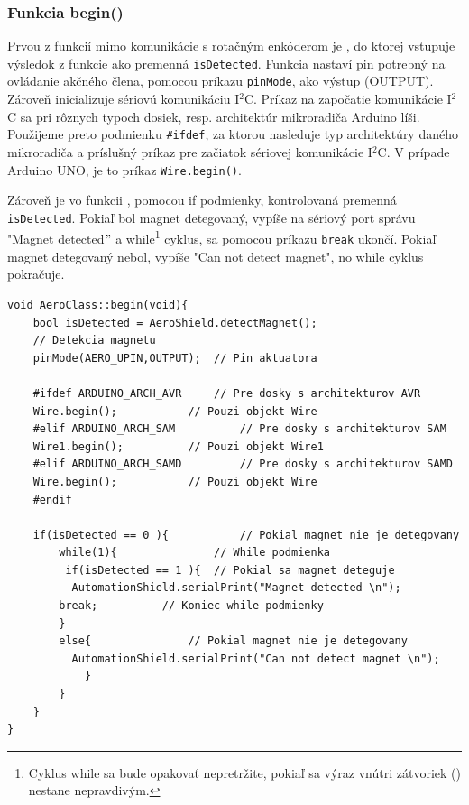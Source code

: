 \subsubsection{Funkcia begin()}

Prvou z funkcií mimo komunikácie s rotačným enkóderom je , do ktorej vstupuje výsledok z funkcie  ako premenná \verb|isDetected|. Funkcia  nastaví pin potrebný na ovládanie akčného člena, pomocou príkazu \verb|pinMode|, ako výstup (OUTPUT). Zároveň inicializuje sériovú komunikáciu I$^{2}$C. Príkaz na započatie komunikácie I$^{2}$C sa pri rôznych typoch dosiek, resp. architektúr mikroradiča Arduino líši. Použijeme preto podmienku \verb|#ifdef|, za ktorou nasleduje typ architektúry daného mikroradiča a príslušný príkaz pre začiatok sériovej komunikácie I$^{2}$C. V prípade Arduino UNO, je to príkaz \verb|Wire.begin()|. 

Zároveň je vo funkcii , pomocou if podmienky, kontrolovaná premenná \verb|isDetected|. Pokiaľ bol magnet detegovaný, vypíše na sériový port správu "Magnet detected$"$ a while\footnote[7]{Cyklus while sa bude opakovať nepretržite, pokiaľ sa výraz vnútri zátvoriek () nestane nepravdivým.} cyklus, sa pomocou príkazu \verb|break| ukončí. Pokiaľ magnet detegovaný nebol, vypíše "Can not detect magnet", no while cyklus pokračuje.  


\begin{lstlisting}[caption={Zdrojový kód funkcie begin.},captionpos=b]
void AeroClass::begin(void){                       
	bool isDetected = AeroShield.detectMagnet(); 
	// Detekcia magnetu 
	pinMode(AERO_UPIN,OUTPUT);	// Pin aktuatora
	
	#ifdef ARDUINO_ARCH_AVR		// Pre dosky s architekturov AVR
	Wire.begin();			// Pouzi objekt Wire
	#elif ARDUINO_ARCH_SAM      	// Pre dosky s architekturov SAM
	Wire1.begin();			// Pouzi objekt Wire1
	#elif ARDUINO_ARCH_SAMD     	// Pre dosky s architekturov SAMD
	Wire.begin();			// Pouzi objekt Wire
	#endif
	
	if(isDetected == 0 ){       	// Pokial magnet nie je detegovany
		while(1){               // While podmienka
		 if(isDetected == 1 ){	// Pokial sa magnet deteguje
		  AutomationShield.serialPrint("Magnet detected \n");	
		break;		    // Koniec while podmienky
		}
		else{               // Pokial magnet nie je detegovany
		  AutomationShield.serialPrint("Can not detect magnet \n");
			}
		}
	}       
} 
\end{lstlisting}

